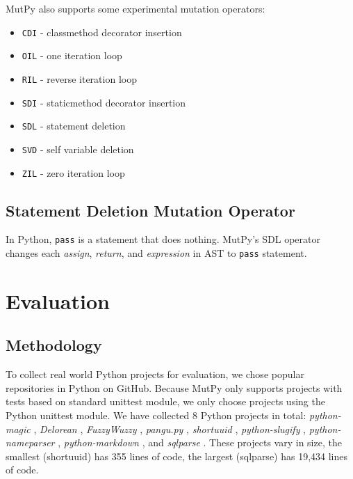 \documentclass[12pt]{article}
\begin{document}
MutPy also supports some experimental mutation operators:

\begin{itemize}
  \itemsep0em 
  \item \texttt{CDI} - classmethod decorator insertion
  \item \texttt{OIL} - one iteration loop
  \item \texttt{RIL} - reverse iteration loop
  \item \texttt{SDI} - staticmethod decorator insertion
  \item \texttt{SDL} - statement deletion
  \item \texttt{SVD} - self variable deletion
  \item \texttt{ZIL} - zero iteration loop
\end{itemize}

\subsection{Statement Deletion Mutation Operator}

In Python, \texttt{pass} is a statement that does nothing. MutPy's SDL operator changes each \emph{assign}, \emph{return}, and \emph{expression} in AST to \texttt{pass} statement.

\section{Evaluation}

\subsection{Methodology}

To collect real world Python projects for evaluation, we chose popular repositories in Python on GitHub. Because MutPy only supports projects with tests based on standard unittest module, we only choose projects using the Python unittest module. We have collected 8 Python projects in total: \emph{python-magic} \cite{python-magic}, \emph{Delorean} \cite{delorean}, \emph{FuzzyWuzzy} \cite{fuzzywuzzy}, \emph{pangu.py} \cite{pangu.py}, \emph{shortuuid} \cite{shortuuid}, \emph{python-slugify} \cite{python-slugify}, \emph{python-nameparser} \cite{python-nameparser}, \emph{python-markdown} \cite{python-markdown}, and \emph{sqlparse} \cite{sqlparse}. These projects vary in size, the smallest (shortuuid) has 355 lines of code, the largest (sqlparse) has 19,434 lines of code.
\end{document}

